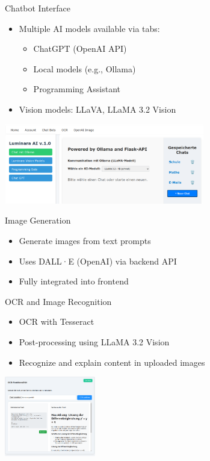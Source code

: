 \documentclass{beamer}
\begin{document}
\begin{frame}{Chatbot Interface}
  \begin{itemize}
    \item Multiple AI models available via tabs:
    \begin{itemize}
      \item ChatGPT (OpenAI API)
      \item Local models (e.g., Ollama)
      \item Programming Assistant
    \end{itemize}
    \item Vision models: LLaVA, LLaMA 3.2 Vision
  \end{itemize}
  \vspace{0.5cm}
  \centering
  \includegraphics[height=3.5cm]{Chat-Bot-Navigation-Bar.png} %
\end{frame}

\begin{frame}{Image Generation}
  \begin{itemize}
    \item Generate images from text prompts
    \item Uses DALL·E (OpenAI) via backend API
    \item Fully integrated into frontend
  \end{itemize}
  \vspace{0.5cm}
  \centering
\end{frame}

\begin{frame}{OCR and Image Recognition}
  \begin{itemize}
    \item OCR with Tesseract
    \item Post-processing using LLaMA 3.2 Vision
    \item Recognize and explain content in uploaded images
  \end{itemize}
  \vspace{0.5cm}
  \centering
  \includegraphics[height=3.5cm]{OCR-functonalatie.png} %
\end{frame}
\end{document}
